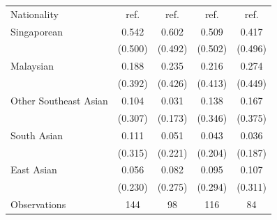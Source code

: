 {\begin{tabular}{l*{4}{c}}
Nationality         &        ref.&        ref.&        ref.&        ref.\\
Singaporean         &       0.542&       0.602&       0.509&       0.417\\
                    &     (0.500)&     (0.492)&     (0.502)&     (0.496)\\
Malaysian           &       0.188&       0.235&       0.216&       0.274\\
                    &     (0.392)&     (0.426)&     (0.413)&     (0.449)\\
Other Southeast Asian&       0.104&       0.031&       0.138&       0.167\\
                    &     (0.307)&     (0.173)&     (0.346)&     (0.375)\\
South Asian         &       0.111&       0.051&       0.043&       0.036\\
                    &     (0.315)&     (0.221)&     (0.204)&     (0.187)\\
East Asian          &       0.056&       0.082&       0.095&       0.107\\
                    &     (0.230)&     (0.275)&     (0.294)&     (0.311)\\
\midrule
Observations        &         144&          98&         116&          84\\
\bottomrule
\end{tabular}
}
